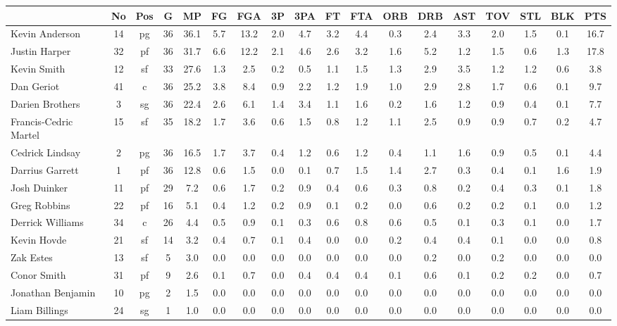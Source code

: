 \documentclass[10pt,letterpaper]{article}
\begin{document}
\begin{table}[ht]
\begin{center}
\begin{tabular}{lccccccccccccccccc}
  \hline
 & No & Pos & G & MP & FG & FGA & 3P & 3PA & FT & FTA & ORB & DRB & AST & TOV & STL & BLK & PTS \\ 
  \hline
Kevin Anderson & 14 & pg & 36 & 36.1 & 5.7 & 13.2 & 2.0 & 4.7 & 3.2 & 4.4 & 0.3 & 2.4 & 3.3 & 2.0 & 1.5 & 0.1 & 16.7 \\ 
  Justin Harper & 32 & pf & 36 & 31.7 & 6.6 & 12.2 & 2.1 & 4.6 & 2.6 & 3.2 & 1.6 & 5.2 & 1.2 & 1.5 & 0.6 & 1.3 & 17.8 \\ 
  Kevin Smith & 12 & sf & 33 & 27.6 & 1.3 & 2.5 & 0.2 & 0.5 & 1.1 & 1.5 & 1.3 & 2.9 & 3.5 & 1.2 & 1.2 & 0.6 & 3.8 \\ 
  Dan Geriot & 41 & c & 36 & 25.2 & 3.8 & 8.4 & 0.9 & 2.2 & 1.2 & 1.9 & 1.0 & 2.9 & 2.8 & 1.7 & 0.6 & 0.1 & 9.7 \\ 
  Darien Brothers & 3 & sg & 36 & 22.4 & 2.6 & 6.1 & 1.4 & 3.4 & 1.1 & 1.6 & 0.2 & 1.6 & 1.2 & 0.9 & 0.4 & 0.1 & 7.7 \\ 
  Francis-Cedric Martel & 15 & sf & 35 & 18.2 & 1.7 & 3.6 & 0.6 & 1.5 & 0.8 & 1.2 & 1.1 & 2.5 & 0.9 & 0.9 & 0.7 & 0.2 & 4.7 \\ 
  Cedrick Lindsay & 2 & pg & 36 & 16.5 & 1.7 & 3.7 & 0.4 & 1.2 & 0.6 & 1.2 & 0.4 & 1.1 & 1.6 & 0.9 & 0.5 & 0.1 & 4.4 \\ 
  Darrius Garrett & 1 & pf & 36 & 12.8 & 0.6 & 1.5 & 0.0 & 0.1 & 0.7 & 1.5 & 1.4 & 2.7 & 0.3 & 0.4 & 0.1 & 1.6 & 1.9 \\ 
  Josh Duinker & 11 & pf & 29 & 7.2 & 0.6 & 1.7 & 0.2 & 0.9 & 0.4 & 0.6 & 0.3 & 0.8 & 0.2 & 0.4 & 0.3 & 0.1 & 1.8 \\ 
  Greg Robbins & 22 & pf & 16 & 5.1 & 0.4 & 1.2 & 0.2 & 0.9 & 0.1 & 0.2 & 0.0 & 0.6 & 0.2 & 0.2 & 0.1 & 0.0 & 1.2 \\ 
  Derrick Williams & 34 & c & 26 & 4.4 & 0.5 & 0.9 & 0.1 & 0.3 & 0.6 & 0.8 & 0.6 & 0.5 & 0.1 & 0.3 & 0.1 & 0.0 & 1.7 \\ 
  Kevin Hovde & 21 & sf & 14 & 3.2 & 0.4 & 0.7 & 0.1 & 0.4 & 0.0 & 0.0 & 0.2 & 0.4 & 0.4 & 0.1 & 0.0 & 0.0 & 0.8 \\ 
  Zak Estes & 13 & sf & 5 & 3.0 & 0.0 & 0.0 & 0.0 & 0.0 & 0.0 & 0.0 & 0.0 & 0.2 & 0.0 & 0.2 & 0.0 & 0.0 & 0.0 \\ 
  Conor Smith & 31 & pf & 9 & 2.6 & 0.1 & 0.7 & 0.0 & 0.4 & 0.4 & 0.4 & 0.1 & 0.6 & 0.1 & 0.2 & 0.2 & 0.0 & 0.7 \\ 
  Jonathan Benjamin & 10 & pg & 2 & 1.5 & 0.0 & 0.0 & 0.0 & 0.0 & 0.0 & 0.0 & 0.0 & 0.0 & 0.0 & 0.0 & 0.0 & 0.0 & 0.0 \\ 
  Liam Billings & 24 & sg & 1 & 1.0 & 0.0 & 0.0 & 0.0 & 0.0 & 0.0 & 0.0 & 0.0 & 0.0 & 0.0 & 0.0 & 0.0 & 0.0 & 0.0 \\ 
   \hline
\end{tabular}
\end{center}
\end{table}
\end{document}
